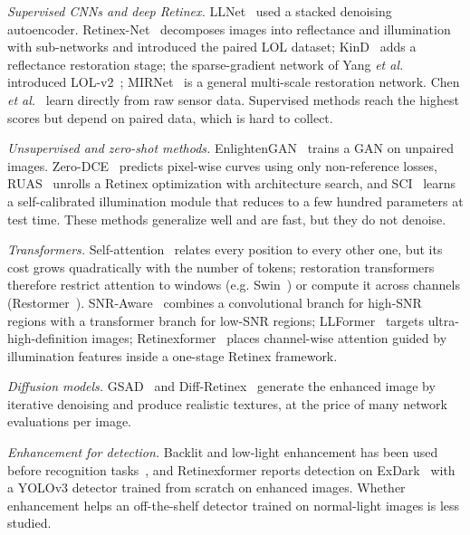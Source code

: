 \documentclass[journal]{IEEEtran}
\begin{document}
\emph{Supervised CNNs and deep Retinex.} LLNet~\cite{lore2017llnet} used a stacked denoising autoencoder.
Retinex-Net~\cite{wei2018retinexnet} decomposes images into reflectance and illumination with sub-networks and
introduced the paired LOL dataset; KinD~\cite{zhang2019kind} adds a reflectance restoration stage; the
sparse-gradient network of Yang \emph{et al.} introduced LOL-v2~\cite{yang2021lolv2}; MIRNet~\cite{zamir2020mirnet}
is a general multi-scale restoration network. Chen \emph{et al.}~\cite{chen2018sid} learn directly from raw sensor
data. Supervised methods reach the highest scores but depend on paired data, which is hard to collect.

\emph{Unsupervised and zero-shot methods.} EnlightenGAN~\cite{jiang2021enlightengan} trains a GAN on unpaired
images. Zero-DCE~\cite{guo2020zerodce} predicts pixel-wise curves using only non-reference losses, RUAS~\cite{liu2021ruas}
unrolls a Retinex optimization with architecture search, and SCI~\cite{ma2022sci} learns a self-calibrated
illumination module that reduces to a few hundred parameters at test time. These methods generalize well and are
fast, but they do not denoise.

\emph{Transformers.} Self-attention~\cite{vaswani2017attention} relates every position to every other one, but its
cost grows quadratically with the number of tokens; restoration transformers therefore restrict attention to windows
(e.g. Swin~\cite{liu2021swin}) or compute it across channels (Restormer~\cite{zamir2022restormer}).
SNR-Aware~\cite{xu2022snr} combines a convolutional branch for high-SNR regions with a transformer branch for
low-SNR regions; LLFormer~\cite{wang2023llformer} targets ultra-high-definition images; Retinexformer~\cite{cai2023retinexformer}
places channel-wise attention guided by illumination features inside a one-stage Retinex framework.

\emph{Diffusion models.} GSAD~\cite{hou2023gsad} and Diff-Retinex~\cite{yi2023diffretinex} generate the enhanced
image by iterative denoising and produce realistic textures, at the price of many network evaluations per image.

\emph{Enhancement for detection.} Backlit and low-light enhancement has been used before recognition
tasks~\cite{bose2023luminet}, and Retinexformer reports detection on ExDark~\cite{loh2019exdark} with a YOLOv3 detector
trained from scratch on enhanced images. Whether enhancement helps an off-the-shelf detector trained on normal-light
images is less studied.
\end{document}
